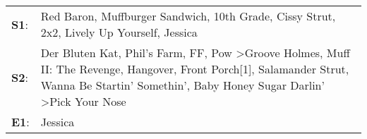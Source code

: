 \begin{supertabular}{p{0.03\textwidth}p{0.92\textwidth}}
 \textbf{S1}:  &                                                                                                                                                                                                                                                                    Red Baron\textsuperscript{}, \enspace Muffburger Sandwich\textsuperscript{}, \enspace 10th Grade\textsuperscript{}, \enspace Cissy Strut\textsuperscript{}, \enspace 2x2\textsuperscript{}, \enspace Lively Up Yourself\textsuperscript{}, \enspace Jessica\textsuperscript{}  \enspace  \\
 \textbf{S2}:  &  Der Bluten Kat\textsuperscript{}, \enspace Phil's Farm\textsuperscript{}, \enspace FF\textsuperscript{}, \enspace Pow\textsuperscript{} \textgreater \enspace Groove Holmes\textsuperscript{}, \enspace Muff II: The Revenge\textsuperscript{}, \enspace Hangover\textsuperscript{}, \enspace Front Porch[1]\textsuperscript{}, \enspace Salamander Strut\textsuperscript{}, \enspace Wanna Be Startin' Somethin'\textsuperscript{}, \enspace Baby Honey Sugar Darlin'\textsuperscript{} \textgreater \enspace Pick Your Nose\textsuperscript{}  \enspace  \\
 \textbf{E1}:  &                                                                                                                                                                                                                                                                                                                                                                                                                                                                                                                        Jessica\textsuperscript{}  \enspace  \\
\end{supertabular}
